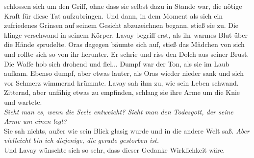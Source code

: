 schlossen sich um den Griff, ohne dass sie selbst dazu in Stande war, die nötige Kraft für diese 
Tat aufzubringen. Und dann, in dem Moment als sich ein zufriedenes Grinsen auf seinem Gesicht 
abzuzeichnen begann, stieß sie zu. Die klinge verschwand in seinem Körper. Lavay begriff erst, als 
ihr warmes Blut über die Hände sprudelte. Oras dagegen bäumte sich auf, stieß das Mädchen von sich 
und rollte sich so von ihr herunter. Er schrie und riss den Dolch aus seiner Brust. Die Waffe hob 
sich drohend und fiel... Dumpf war der Ton, als sie im Laub aufkam. Ebenso dumpf, aber etwas lauter, 
als Oras wieder nieder sank und sich vor Schmerz wimmernd krümmte. Lavay sah ihm zu, wie sein Leben 
schwand. Zitternd, aber unfähig etwas zu empfinden, schlang sie ihre Arme um die Knie und 
wartete.\\
\textit{Sieht man es, wenn die Seele entweicht? Sieht man den Todesgott, der seine Arme um einen 
legt?}\\
Sie sah nichts, außer wie sein Blick glasig wurde und in die andere Welt saß. \textit{Aber 
vielleicht bin ich diejenige, die gerade gestorben ist.}\\
Und Lavay wünschte sich so sehr, dass dieser Gedanke Wirklichkeit wäre.\\

